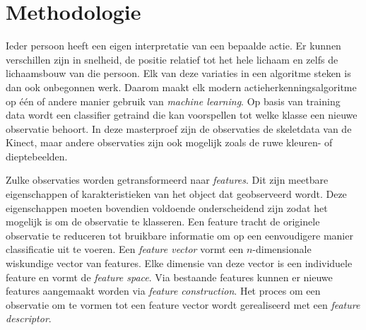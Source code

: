 \chapter{Methodologie}
\label{ch:methodologie}

Ieder persoon heeft een eigen interpretatie van een bepaalde actie. Er kunnen verschillen zijn in snelheid, de positie relatief tot het hele lichaam en zelfs de lichaamsbouw van die persoon. Elk van deze variaties in een algoritme steken is dan ook onbegonnen werk. Daarom maakt elk modern actieherkenningsalgoritme op één of andere manier gebruik van \textit{machine learning}. Op basis van training data wordt een classifier getraind die kan voorspellen tot welke klasse een nieuwe observatie behoort. In deze masterproef zijn de observaties de skeletdata van de Kinect, maar andere observaties zijn ook mogelijk zoals de ruwe kleuren- of dieptebeelden.

Zulke observaties worden getransformeerd naar \textit{features}. Dit zijn meetbare eigenschappen of karakteristieken van het object dat geobserveerd wordt. Deze eigenschappen moeten bovendien voldoende onderscheidend zijn zodat het mogelijk is om de observatie te klasseren. Een feature tracht de originele observatie te reduceren tot bruikbare informatie om op een eenvoudigere manier classificatie uit te voeren. Een \textit{feature vector} vormt een $n$-dimensionale wiskundige vector van features. Elke dimensie van deze vector is een individuele feature en vormt de \textit{feature space}. Via bestaande features kunnen er nieuwe features aangemaakt worden via \textit{feature construction}. Het proces om een observatie om te vormen tot een feature vector wordt gerealiseerd met een \textit{feature descriptor}.


